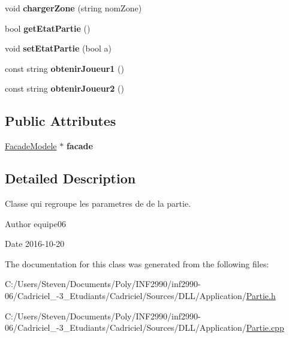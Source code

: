 \begin{DoxyCompactItemize}
\hypertarget{class_partie_ac0747c32bd176efc2993a23100a44a0a}{}\label{class_partie_ac0747c32bd176efc2993a23100a44a0a} 
void {\bfseries charger\+Zone} (string nom\+Zone)
\item 
\hypertarget{class_partie_aa4e3abdd7d14f8d8e3fc1af5f1cdbdf8}{}\label{class_partie_aa4e3abdd7d14f8d8e3fc1af5f1cdbdf8} 
bool {\bfseries get\+Etat\+Partie} ()
\item 
\hypertarget{class_partie_ab88eb7e47b3da834363f2534786211fb}{}\label{class_partie_ab88eb7e47b3da834363f2534786211fb} 
void {\bfseries set\+Etat\+Partie} (bool a)
\item 
\hypertarget{class_partie_a8b0b9e7f1893322ece16c461d9874298}{}\label{class_partie_a8b0b9e7f1893322ece16c461d9874298} 
const string {\bfseries obtenir\+Joueur1} ()
\item 
\hypertarget{class_partie_a729d9bd870932bc2bbf9a6b3b510994c}{}\label{class_partie_a729d9bd870932bc2bbf9a6b3b510994c} 
const string {\bfseries obtenir\+Joueur2} ()
\end{DoxyCompactItemize}
\subsection*{Public Attributes}
\begin{DoxyCompactItemize}
\item 
\hypertarget{class_partie_a7d70f99d8f87219f2ddeaebc9773a623}{}\label{class_partie_a7d70f99d8f87219f2ddeaebc9773a623} 
\hyperlink{class_facade_modele}{Facade\+Modele} $\ast$ {\bfseries facade}
\end{DoxyCompactItemize}


\subsection{Detailed Description}
Classe qui regroupe les parametres de de la partie. 

\begin{DoxyAuthor}{Author}
equipe06 
\end{DoxyAuthor}
\begin{DoxyDate}{Date}
2016-\/10-\/20 
\end{DoxyDate}


The documentation for this class was generated from the following files\+:\begin{DoxyCompactItemize}
\item 
C\+:/\+Users/\+Steven/\+Documents/\+Poly/\+I\+N\+F2990/inf2990-\/06/\+Cadriciel\+\_-\/3\+\_\+\+Etudiants/\+Cadriciel/\+Sources/\+D\+L\+L/\+Application/\hyperlink{_partie_8h}{Partie.\+h}\item 
C\+:/\+Users/\+Steven/\+Documents/\+Poly/\+I\+N\+F2990/inf2990-\/06/\+Cadriciel\+\_-\/3\+\_\+\+Etudiants/\+Cadriciel/\+Sources/\+D\+L\+L/\+Application/\hyperlink{_partie_8cpp}{Partie.\+cpp}\end{DoxyCompactItemize}
